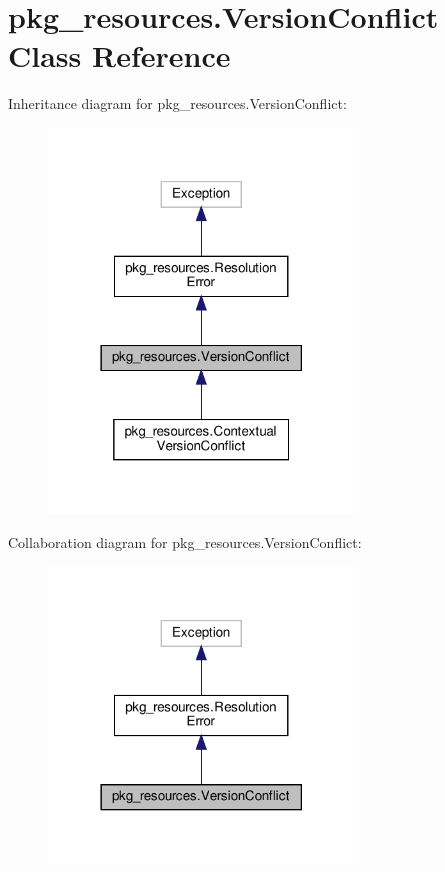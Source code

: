 \hypertarget{classpkg__resources_1_1VersionConflict}{}\section{pkg\+\_\+resources.\+Version\+Conflict Class Reference}
\label{classpkg__resources_1_1VersionConflict}


Inheritance diagram for pkg\+\_\+resources.\+Version\+Conflict\+:
\nopagebreak
\begin{figure}[H]
\begin{center}
\leavevmode
\includegraphics[width=230pt]{classpkg__resources_1_1VersionConflict__inherit__graph}
\end{center}
\end{figure}


Collaboration diagram for pkg\+\_\+resources.\+Version\+Conflict\+:
\nopagebreak
\begin{figure}[H]
\begin{center}
\leavevmode
\includegraphics[width=230pt]{classpkg__resources_1_1VersionConflict__coll__graph}
\end{center}
\end{figure}
